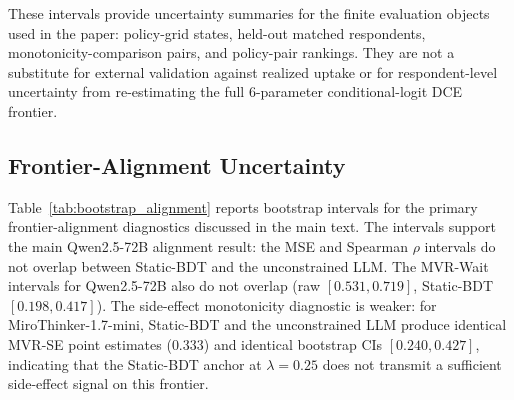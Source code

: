 \documentclass[11pt]{article}
\begin{document}
These intervals provide uncertainty summaries for the finite evaluation objects used in the paper: policy-grid states, held-out matched respondents, monotonicity-comparison pairs, and policy-pair rankings. They are not a substitute for external validation against realized uptake or for respondent-level uncertainty from re-estimating the full 6-parameter conditional-logit DCE frontier.

\subsection{Frontier-Alignment Uncertainty}

Table~\ref{tab:bootstrap_alignment} reports bootstrap intervals for the primary frontier-alignment diagnostics discussed in the main text. The intervals support the main Qwen2.5-72B alignment result: the MSE and Spearman $\rho$ intervals do not overlap between Static-BDT and the unconstrained LLM. The MVR-Wait intervals for Qwen2.5-72B also do not overlap (raw $[0.531, 0.719]$, Static-BDT $[0.198, 0.417]$). The side-effect monotonicity diagnostic is weaker: for MiroThinker-1.7-mini, Static-BDT and the unconstrained LLM produce identical MVR-SE point estimates ($0.333$) and identical bootstrap CIs $[0.240, 0.427]$, indicating that the Static-BDT anchor at $\lambda=0.25$ does not transmit a sufficient side-effect signal on this frontier.
\end{document}
